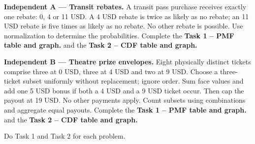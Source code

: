 \medskip
\noindent\begin{minipage}[t]{.48\linewidth}
\vspace{0pt}
{\setlength{\fboxsep}{2pt}\colorbox{black!10}{\textbf{Independent A --- Transit rebates.}}}
A transit pass purchase receives exactly one rebate: 0, 4 or 11 USD.
A 4 USD rebate is twice as likely as no rebate; an 11 USD rebate is
five times as likely as no rebate. No other rebate is possible.
Use normalization to determine the probabilities. Complete the \textbf{Task 1 -- PMF table and graph.} and the \textbf{Task 2 -- CDF table and graph.}
\end{minipage}\hfill
\begin{minipage}[t]{.48\linewidth}
\vspace{0pt}
{\setlength{\fboxsep}{2pt}\colorbox{black!10}{\textbf{Independent B --- Theatre prize envelopes.}}}
Eight physically distinct tickets comprise three at 0 USD, three at 4 USD
and two at 9 USD. Choose a three-ticket subset uniformly without replacement;
ignore order. Sum face values and add one 5 USD bonus if both a 4 USD and
a 9 USD ticket occur. Then cap the payout at 19 USD. No other payments apply.
Count subsets using combinations and aggregate equal payouts. Complete the \textbf{Task 1 -- PMF table and graph.} and the \textbf{Task 2 -- CDF table and graph.}
\end{minipage}\par
Do Task 1 and Task 2 for each problem.
\endgroup

